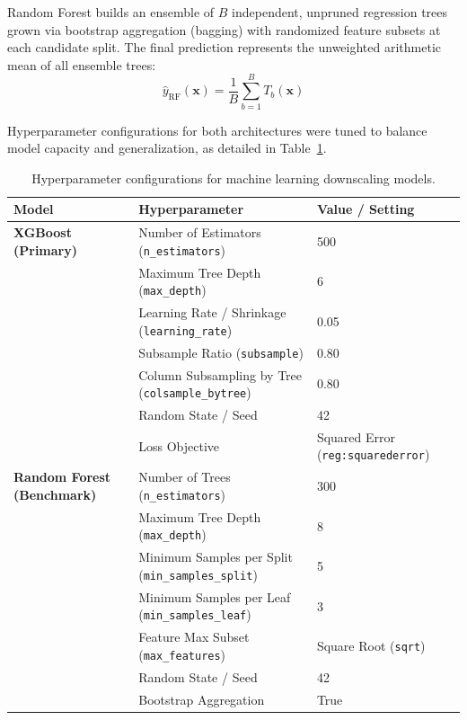 \documentclass[a4paper,fleqn]{cas-sc}
\begin{document}
Random Forest builds an ensemble of $B$ independent, unpruned regression trees grown via bootstrap aggregation (bagging) with randomized feature subsets at each candidate split. The final prediction represents the unweighted arithmetic mean of all ensemble trees:
\begin{equation}
    \hat{y}_{\text{RF}}(\mathbf{x}) = \frac{1}{B} \sum_{b=1}^B T_b(\mathbf{x})
    \label{eq:rf_pred}
\end{equation}

Hyperparameter configurations for both architectures were tuned to balance model capacity and generalization, as detailed in Table~\ref{tab:hyperparameters}.

\begin{table}
\caption{Hyperparameter configurations for machine learning downscaling models.}
\label{tab:hyperparameters}
\footnotesize
\begin{tabular*}{\columnwidth}{@{\extracolsep{\fill}}lll@{}}
\toprule
Model & Hyperparameter & Value / Setting \\
\midrule
\textbf{XGBoost (Primary)} & Number of Estimators (\texttt{n\_estimators}) & 500 \\
& Maximum Tree Depth (\texttt{max\_depth}) & 6 \\
& Learning Rate / Shrinkage (\texttt{learning\_rate}) & 0.05 \\
& Subsample Ratio (\texttt{subsample}) & 0.80 \\
& Column Subsampling by Tree (\texttt{colsample\_bytree}) & 0.80 \\
& Random State / Seed & 42 \\
& Loss Objective & Squared Error (\texttt{reg:squarederror}) \\
\midrule
\textbf{Random Forest (Benchmark)} & Number of Trees (\texttt{n\_estimators}) & 300 \\
& Maximum Tree Depth (\texttt{max\_depth}) & 8 \\
& Minimum Samples per Split (\texttt{min\_samples\_split}) & 5 \\
& Minimum Samples per Leaf (\texttt{min\_samples\_leaf}) & 3 \\
& Feature Max Subset (\texttt{max\_features}) & Square Root (\texttt{sqrt}) \\
& Random State / Seed & 42 \\
& Bootstrap Aggregation & True \\
\bottomrule
\end{tabular*}
\end{table}
\end{document}
